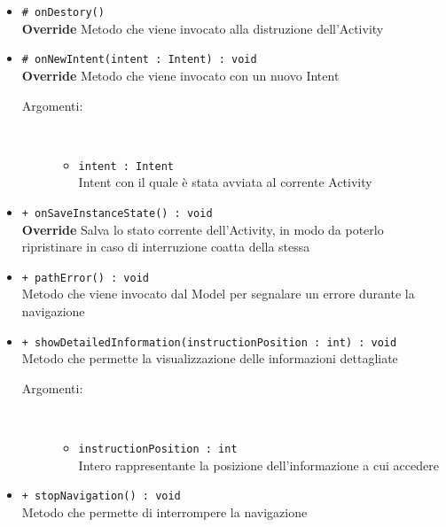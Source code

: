 \documentclass[../DefinizioneDiProdotto.tex]{subfiles}
\begin{document}
\begin{description}
\begin{itemize}
		\item \texttt{\# onDestory()}\\
		\textbf{Override} Metodo che viene invocato alla distruzione dell'Activity
		\item \texttt{\# onNewIntent(intent : Intent) : void}\\
		\textbf{Override} Metodo che viene invocato con un nuovo Intent
		\begin{description}
			\item[Argomenti:] \
			\begin{itemize}
				\item \texttt{intent : Intent}\\
				Intent con il quale è stata avviata al corrente Activity\end{itemize}
		\end{description}
		\item \texttt{+ onSaveInstanceState() : void}\\
		\textbf{Override} Salva lo stato corrente dell'Activity, in modo da poterlo ripristinare in caso di interruzione coatta della stessa
		\item \texttt{+ pathError() : void}\\
		Metodo che viene invocato dal Model per segnalare un errore durante la navigazione
		\item \texttt{+ showDetailedInformation(instructionPosition : int) : void}\\
		Metodo che permette la visualizzazione delle informazioni dettagliate
		\begin{description}
			\item[Argomenti:] \
			\begin{itemize}
				\item \texttt{instructionPosition : int}\\
				Intero rappresentante la posizione dell'informazione a cui accedere\end{itemize}
		\end{description}
		\item \texttt{+ stopNavigation() : void}\\
		Metodo che permette di interrompere la navigazione
	\end{itemize}
\end{description}
\end{document}
